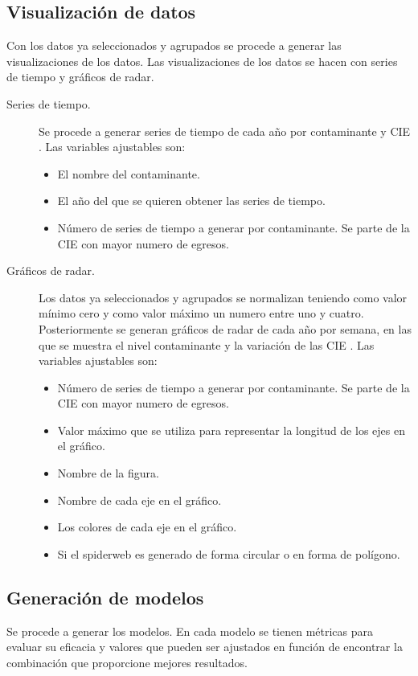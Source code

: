\subsection{Visualización de datos}
Con los datos ya seleccionados y agrupados se procede a generar las visualizaciones de los datos. Las visualizaciones de los datos se hacen con series de tiempo y gráficos de radar.

\begin{description}
\item [Series de tiempo.] {Se procede a generar series de tiempo de cada año por contaminante y CIE \citep{r9}}. Las variables ajustables son:
\begin{itemize}
	\item El nombre del contaminante.
	\item El año del que se quieren obtener las series de tiempo.
	\item Número de series de tiempo a generar por contaminante. Se parte de la CIE \citep{r9} con mayor numero de egresos.
\end{itemize}

\item [Gráficos de radar.] {Los datos ya seleccionados y agrupados se normalizan teniendo como valor mínimo cero y como valor máximo un numero entre uno y cuatro. Posteriormente se generan gráficos de radar de cada año por semana, en las que se muestra el nivel contaminante y la variación de las CIE \citep{r9}}. Las variables ajustables son:
\begin{itemize}
    \item Número de series de tiempo a generar por contaminante. Se parte de la CIE \citep{r9} con mayor numero de egresos.
	\item Valor máximo que se utiliza para representar la longitud de los ejes en el gráfico.
	\item Nombre de la figura.
	\item Nombre de cada eje en el gráfico.
	\item Los colores de cada eje en el gráfico. 
	\item Si el spiderweb es generado de forma circular o en forma de polígono.
\end{itemize}
\end{description}

\subsection{Generación de modelos}
Se procede a generar los modelos. En cada modelo se tienen métricas para evaluar su eficacia y valores que pueden ser ajustados en función de encontrar la combinación que proporcione mejores resultados.

